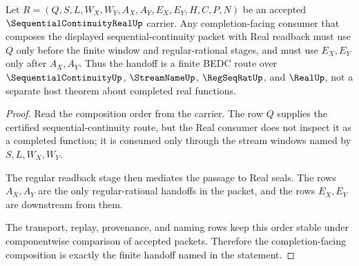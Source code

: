\begin{theorem}
\label{thm:sequential-continuity-real-composition-handoff}
Let $R=(Q,S,L,W_X,W_Y,A_X,A_Y,E_X,E_Y,H,C,P,N)$ be an accepted $\SequentialContinuityRealUp$ carrier. Any completion-facing consumer that composes the displayed sequential-continuity packet with Real readback must use $Q$ only before the finite window and regular-rational stages, and must use $E_X,E_Y$ only after $A_X,A_Y$. Thus the handoff is a finite BEDC route over $\SequentialContinuityUp$, $\StreamNameUp$, $\RegSeqRatUp$, and $\RealUp$, not a separate host theorem about completed real functions.
\end{theorem}
\begin{proof}
Read the composition order from the carrier. The row $Q$ supplies the certified sequential-continuity route, but the Real consumer does not inspect it as a completed function; it is consumed only through the stream windows named by $S,L,W_X,W_Y$.

The regular readback stage then mediates the passage to Real seals. The rows $A_X,A_Y$ are the only regular-rational handoffs in the packet, and the rows $E_X,E_Y$ are downstream from them.

The transport, replay, provenance, and naming rows keep this order stable under componentwise comparison of accepted packets. Therefore the completion-facing composition is exactly the finite handoff named in the statement.
\end{proof}


\begin{closurestatus}{\SequentialContinuityRealUp}
  \theoryclosure{\seedClosure}
  \formalstatus{\unformalizedV}
\end{closurestatus}
